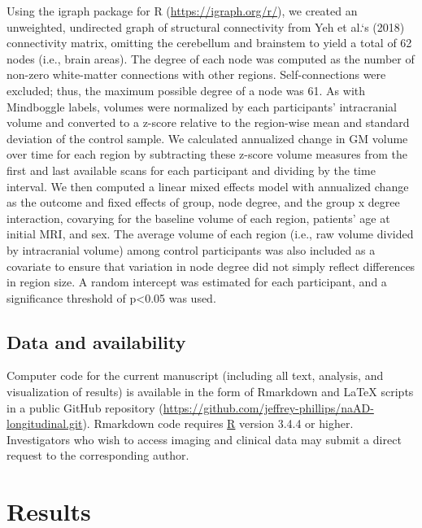\documentclass[]{article}
\begin{document}
Using the igraph package for R (\url{https://igraph.org/r/}), we created
an unweighted, undirected graph of structural connectivity from Yeh et
al.`s (2018) connectivity matrix, omitting the cerebellum and brainstem
to yield a total of 62 nodes (i.e., brain areas). The degree of each
node was computed as the number of non-zero white-matter connections
with other regions. Self-connections were excluded; thus, the maximum
possible degree of a node was 61. As with Mindboggle labels, volumes
were normalized by each participants' intracranial volume and converted
to a z-score relative to the region-wise mean and standard deviation of
the control sample. We calculated annualized change in GM volume over
time for each region by subtracting these z-score volume measures from
the first and last available scans for each participant and dividing by
the time interval. We then computed a linear mixed effects model with
annualized change as the outcome and fixed effects of group, node
degree, and the group x degree interaction, covarying for the baseline
volume of each region, patients' age at initial MRI, and sex. The
average volume of each region (i.e., raw volume divided by intracranial
volume) among control participants was also included as a covariate to
ensure that variation in node degree did not simply reflect differences
in region size. A random intercept was estimated for each participant,
and a significance threshold of p\textless{}0.05 was used.

\subsection*{Data and availability}\label{data-and-availability}

Computer code for the current manuscript (including all text, analysis,
and visualization of results) is available in the form of Rmarkdown and
LaTeX scripts in a public GitHub repository
(\url{https://github.com/jeffrey-phillips/naAD-longitudinal.git}).
Rmarkdown code requires \href{https://cran.r-project.org/}{R} version
3.4.4 or higher. Investigators who wish to access imaging and clinical
data may submit a direct request to the corresponding author.

\section*{Results}\label{results}
\end{document}
